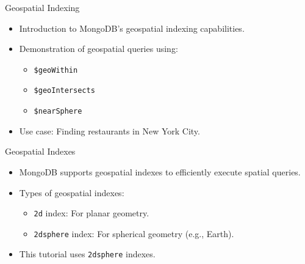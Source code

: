 \documentclass[aspectratio=169]{beamer}
\begin{document}

\begin{frame}{Geospatial Indexing}
	\begin{itemize}
		\item Introduction to MongoDB's geospatial indexing capabilities.
		\item Demonstration of geospatial queries using:
			\begin{itemize}
				\item \texttt{\$geoWithin}
				\item \texttt{\$geoIntersects}
				\item \texttt{\$nearSphere}
			\end{itemize}
		\item Use case: Finding restaurants in New York City.
	\end{itemize}
\end{frame}

\begin{frame}{Geospatial Indexes}
	\begin{itemize}
		\item MongoDB supports geospatial indexes to efficiently execute spatial queries.
		\item Types of geospatial indexes:
			\begin{itemize}
				\item \texttt{2d} index: For planar geometry.
				\item \texttt{2dsphere} index: For spherical geometry (e.g., Earth).
			\end{itemize}
		\item This tutorial uses \texttt{2dsphere} indexes.
	\end{itemize}
\end{frame}
\end{document}

